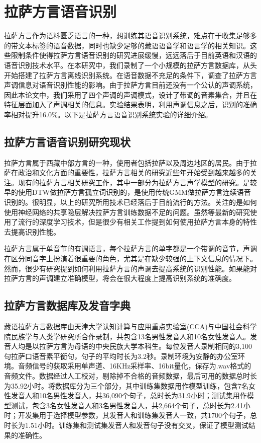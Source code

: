 
\chapter{拉萨方言语音识别}
拉萨方言作为语料匮乏语言的一种，想训练其语音识别系统，难点在于收集足够多的带文本标签的语音数据，同时也缺少足够的藏语语音学和语言学的相关知识。这些限制条件使得拉萨方言语音识别的研究进展缓慢，远远落后于目前英语和汉语的语音识别技术水平。在本研究中，我们录制了一个小规模的拉萨方言数据库，从头开始搭建了拉萨方言离线识别系统。在语音数据不充足的条件下，调查了拉萨方言声调信息对语音识别性能的影响。由于拉萨方言目前还没有一个公认的声调系统，因此本论文中，我们采用了四个声调的声调模式，设计了带调的音素集合，并且在特征层面加入了声调相关的信息。实验结果表明，利用声调信息之后，识别的准确率相对提升16.0\%。以下是拉萨方言语音识别系统实验的详细介绍。
\section{拉萨方言语音识别研究现状}
拉萨方言属于西藏中部方言的一种，使用者包括拉萨以及周边地区的居民。由于拉萨在政治和文化方面的重要性，拉萨方言相关的研究近些年开始受到越来越多的关注。现有的拉萨方言相关研究工作，其中一部分为拉萨方言声学模型的研究。\cite{yao2009research}是较早的使用DTW做拉萨方言孤立词识别的，\cite{li2012research}\cite{li2014large}是使用传统GMM做拉萨方言连续语音识别的。很明显，以上的研究所用技术已经落后于目前流行的方法。\cite{wang2014cross}\cite{zhao2015shared}关注的是如何使用神经网络的共享隐层解决拉萨方言训练数据不足的问题。虽然\cite{wang2014cross}\cite{zhao2015shared}等最新的研究使用了流行的深度学习技术，但是很少有相关工作提到如何使用拉萨方言本身的特性去提高识别性能。

拉萨方言属于单音节的有调语言，每个拉萨方言的单字都是一个带调的音节，声调在区分同音字上扮演着很重要的角色，尤其是在缺少较强的上下文信息的情况下。然而，很少有研究提到如何利用拉萨方言的声调去提高系统的识别性能。如果能对拉萨方言的声调建立准确模型，将会在很大程度上提高识别系统的准确度。
\section{拉萨方言数据库及发音字典}
藏语拉萨方言数据库由天津大学认知计算与应用重点实验室(CCA)与中国社会科学院民族学与人类学研究所合作录制，共包含13名男性发音人和10名女性发音人。发音人均是以拉萨方言为母语的中央民族大学本科生。每位发音人录制相同的3,100句拉萨口语音素平衡句，句子的平均时长为3.2秒。录制环境为安静的办公室环境。音频信号的获取采用单声道、16KHz采样率、16bit量化，保存为.wav格式的音频文件。数据经过人工校对，剔除掉不合格的音频数据，最后可用的数据总时长为35.92小时。将数据库分为三个部分，其中训练集数据用作模型训练，包含7名女性发音人和10名男性发音人，共36,090个句子，总时长为31.9小时；测试集用作模型测试，包含3名女性发音人和3名男性发音人，共2,664个句子，总时长为2.41小时；开发集用于选择模型参数，其发音人和训练集发音人一致，共1700个句子，总时长为1.51小时。训练集和测试集发音人和发音句子没有交叉，保证了模型测试结果的准确性。

